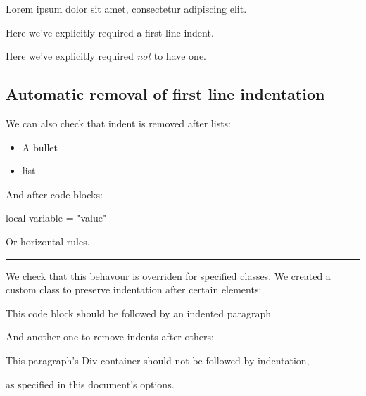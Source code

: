 \documentclass[
  letterpaper,
  DIV=11,
  numbers=noendperiod]{scrartcl}
\makeatletter
\newenvironment{Shaded}{\begin{snugshade}}{\end{snugshade}}
\newcommand{\KeywordTok}[1]{\textcolor[rgb]{0.00,0.23,0.31}{#1}}
\newcommand{\NormalTok}[1]{\textcolor[rgb]{0.00,0.23,0.31}{#1}}
\newcommand{\OperatorTok}[1]{\textcolor[rgb]{0.37,0.37,0.37}{#1}}
\newcommand{\StringTok}[1]{\textcolor[rgb]{0.13,0.47,0.30}{#1}}
\providecommand{\tightlist}{%
  \setlength{\itemsep}{0pt}\setlength{\parskip}{0pt}}\usepackage{longtable,booktabs,array}
\renewenvironment{quote}
     {\list{}{\listparindent 1.5em%
              \itemindent \listparindent
              \rightmargin \leftmargin
              \parsep \z@ \@plus \p@}%
            \item\noindent\relax}
      {\endlist}
\makeatother
\begin{document}
\begin{quote}
\noindent Lorem ipsum dolor sit amet, consectetur adipiscing elit.
\end{quote}

\indent Here we've explicitly required a first line indent.

\noindent Here we've explicitly required \emph{not} to have one.

\hypertarget{automatic-removal-of-first-line-indentation}{%
\subsection{Automatic removal of first line
indentation}\label{automatic-removal-of-first-line-indentation}}

We can also check that indent is removed after lists:

\begin{itemize}
\tightlist
\item
  A bullet
\item
  list
\end{itemize}

\noindent And after code blocks:

\begin{Shaded}
\begin{Highlighting}[]
\KeywordTok{local}\NormalTok{ variable }\OperatorTok{=} \StringTok{"value"}
\end{Highlighting}
\end{Shaded}

\noindent Or horizontal rules.

\begin{center}\rule{0.5\linewidth}{0.5pt}\end{center}

\noindent We check that this behavour is overriden for specified
classes. We created a custom class to preserve indentation after certain
elements:

\begin{Shaded}
\begin{Highlighting}[]
\NormalTok{This code block }
\NormalTok{should be followed }
\NormalTok{by an indented }
\NormalTok{paragraph}
\end{Highlighting}
\end{Shaded}

And another one to remove indents after others:

This paragraph's Div container should not be followed by indentation,

\noindent as specified in this document's options.
\end{document}

